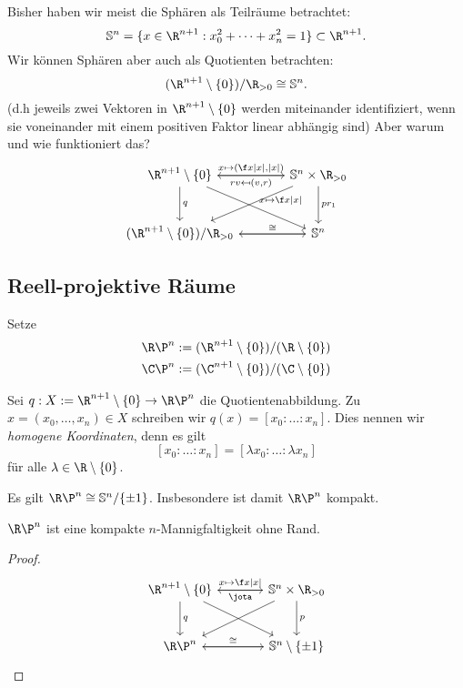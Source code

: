 Bisher haben wir meist die Sphären als Teilräume betrachtet:
\[
	\S^n = \{ x \in \R^{n+1} : x_0^2 + \dotsb + x_n^2 = 1 \} \subset \R^{n+1}.
\]
Wir können Sphären aber auch als Quotienten betrachten:
\[
	(\R^{n+1} \setminus \{0\}) / \R_{>0} \homeomorphic \S^n.
\]
(d.h jeweils zwei Vektoren in $\R^{n+1} \setminus \{0\}$ werden miteinander identifiziert, wenn sie voneinander mit einem positiven Faktor linear abhängig sind)
Aber warum und wie funktioniert das?
\[
	\begin{tikzcd}[column sep=large,row sep=large]
		\R^{n+1} \setminus \{0\} \arrow{r}{x \mapsto (\f x{|x|}, |x|)} \arrow{d}{q} \arrow{dr}{x \mapsto \f x{|x|}} &
		\S^n \times \R_{>0} \arrow{l}{rv \mapsfrom (v,r)} \arrow{dl} \arrow{d}{pr_1} \\
		(\R^{n+1} \setminus \{0\}) / \R_{>0} \arrow{r}{\homeomorphic} &
		\S^n \arrow{l}{}
	\end{tikzcd}
\]

\subsection{Reell-projektive Räume}

Setze
\begin{align*}
	\R\P^n &:= (\R^{n+1} \setminus \{0\}) / (\R \setminus \{0\}) \\
	\C\P^n &:= (\C^{n+1} \setminus \{0\}) / (\C \setminus \{0\})
\end{align*}

Sei $q: X := \R^{n+1} \setminus \{0\} \to \R\P^n$ die Quotientenabbildung.
Zu $x = (x_0, \dotsc, x_n) \in X$ schreiben wir $q(x) = [x_0 : \dotsc : x_n]$.
Dies nennen wir \emph{homogene Koordinaten}, denn es gilt
\[
	[x_0 : \dotsc : x_n ] = [\lambda x_0 : \dotsc : \lambda x_n]
\]
für alle $\lambda \in \R \setminus \{0\}$.

\begin{nt}
	Es gilt $\R\P^n \homeomorphic \S^n / \{\pm 1\}$.
	Insbesondere ist damit $\R\P^n$ kompakt.

	$\R\P^n$ ist eine kompakte $n$-Mannigfaltigkeit ohne Rand.
	\begin{proof}
		\[
			\begin{tikzcd}[column sep=large,row sep=large]
				\R^{n+1} \setminus \{0\} \arrow{r}{x\mapsto \f x{|x|}} \arrow{d}{q} \arrow{dr}{} &
				\S^n \times \R_{>0} \arrow{l}{\jota} \arrow{dl} \arrow{d}{p} \\
				\R\P^n \arrow{r}{\homeomorphic} &
				\S^n \setminus \{\pm 1\} \arrow{l}
			\end{tikzcd}
		\]
	\end{proof}
\end{nt}



